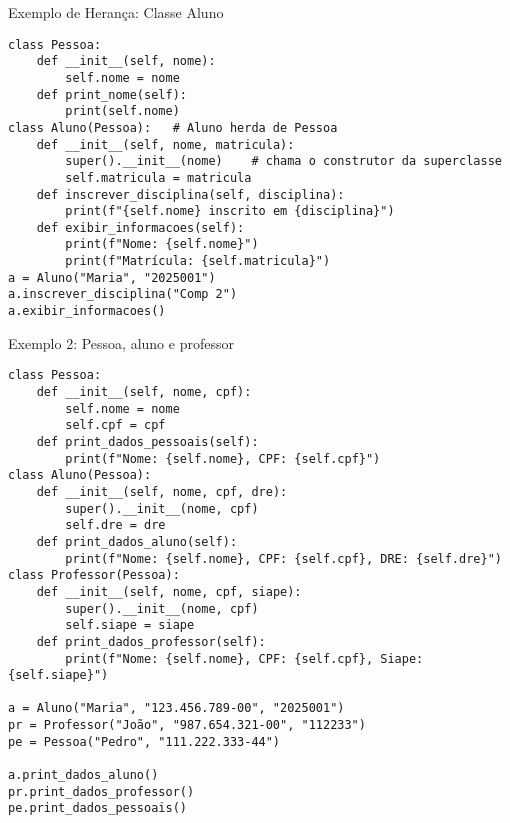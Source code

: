 \begin{frame}[fragile]{Exemplo de Herança: Classe Aluno}

\small

\begin{verbatim}
class Pessoa:
    def __init__(self, nome):
        self.nome = nome
    def print_nome(self):
        print(self.nome)
class Aluno(Pessoa):   # Aluno herda de Pessoa
    def __init__(self, nome, matricula):
        super().__init__(nome)    # chama o construtor da superclasse
        self.matricula = matricula
    def inscrever_disciplina(self, disciplina):
        print(f"{self.nome} inscrito em {disciplina}")
    def exibir_informacoes(self):
        print(f"Nome: {self.nome}")
        print(f"Matrícula: {self.matricula}")
a = Aluno("Maria", "2025001")
a.inscrever_disciplina("Comp 2")
a.exibir_informacoes()
\end{verbatim}

\end{frame}



\begin{frame}[fragile]{Exemplo 2: Pessoa, aluno e professor}

\small
\begin{verbatim}
class Pessoa:
    def __init__(self, nome, cpf):
        self.nome = nome
        self.cpf = cpf
    def print_dados_pessoais(self):
        print(f"Nome: {self.nome}, CPF: {self.cpf}")
class Aluno(Pessoa):
    def __init__(self, nome, cpf, dre):
        super().__init__(nome, cpf)
        self.dre = dre
    def print_dados_aluno(self):
        print(f"Nome: {self.nome}, CPF: {self.cpf}, DRE: {self.dre}")
class Professor(Pessoa):
    def __init__(self, nome, cpf, siape):
        super().__init__(nome, cpf)
        self.siape = siape
    def print_dados_professor(self):
        print(f"Nome: {self.nome}, CPF: {self.cpf}, Siape: {self.siape}")

a = Aluno("Maria", "123.456.789-00", "2025001")
pr = Professor("João", "987.654.321-00", "112233")
pe = Pessoa("Pedro", "111.222.333-44")

a.print_dados_aluno()
pr.print_dados_professor()
pe.print_dados_pessoais()
\end{verbatim}

\end{frame}


